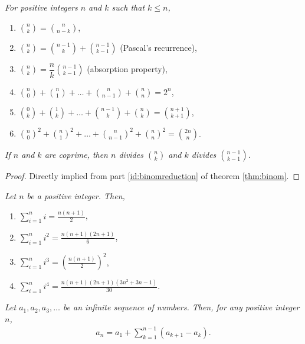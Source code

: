 	
	\begin{theorem}\slshape \label{thm:binom}
		For positive integers $n$ and $k$ such that $k \leq n$,
		\begin{enumerate}
			\item $\displaystyle\binom{n}{k}=\binom{n}{n-k}$,
			\item $\displaystyle\binom{n}{k}=\binom{n-1}k+\binom{n-1}{k-1}$ (Pascal's recurrence),
			\item $\displaystyle\binom{n}{k}=\dfrac{n}{k}\binom{n-1}{k-1}$ (absorption property), \label{id:binomreduction} 
			\item $\displaystyle\binom{n}{0}+\binom{n}{1}+\dots+\binom{n}{n-1}+\binom{n}{n} = 2^n$,
			\item $\displaystyle \binom{0}{k} + \binom{1}{k} + \dots +\binom{n-1}{k} + \binom{n}{k} = \binom{n+1}{k+1}$,
			\item $\displaystyle\binom{n}0^2+\binom{n}{1}^2+\dots+\binom{n}{n-1}^2+\binom{n}{n}^2 = \binom{2n}{n}$. \label{id:binomsquaressum}
		\end{enumerate}
	\end{theorem}
	
	\begin{corollary}\slshape
		If $n$ and $k$ are coprime, then $n$ divides $\binom nk$ and $k$ divides $\binom{n-1}{k-1}$.
	\end{corollary}
	
	\begin{proof}
		Directly implied from part \ref{id:binomreduction} of theorem \eqref{thm:binom}.
	\end{proof}
	
	\begin{identity}\slshape\label{id:sumofpowers}
		Let $n$ be a positive integer. Then,
			\begin{enumerate}
				\item $\displaystyle\sum\limits_{i=1}^{n} i = \frac{n(n+1)}{2}$,
				\item $\displaystyle\sum\limits_{i=1}^{n} i^2 = \frac{n(n+1)(2n+1)}{6}$,
				\item $\displaystyle\sum\limits_{i=1}^{n} i^3 = \left(\frac{n(n+1)}{2}\right)^2$,
				\item $\displaystyle\sum\limits_{i=1}^{n} i^4 = \frac{n(n+1)(2n+1)(3n^2+3n-1)}{30}$.
			\end{enumerate}
	\end{identity}

	\begin{identity}\slshape\label{id:sumofdif}
		Let $a_1, a_2, a_3, \dots$ be an infinite sequence of numbers. Then, for any positive integer $n$,
			\begin{align*}
				a_n  = a_1 + \sum_{k=1}^{n-1} \left(a_{k+1} - a_{k}\right).
			\end{align*}
	\end{identity}
	
